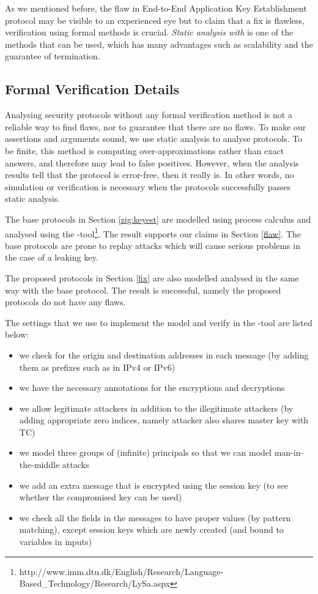 As we mentioned before, the flaw in End-to-End Application Key Establishment protocol may be visible to an experienced eye but to claim that a fix is flawless, verification using formal methods is crucial.
\emph{Static analysis with \LYSA} is one of the methods that can be used, which has many advantages such as scalability and the guarantee of termination.

\subsection{Formal Verification Details}
\label{zig:formal}
Analysing security protocols without any formal verification method is
not a reliable way to find flaws, nor to guarantee that there are no
flaws. To make our assertions and arguments sound, we use static
analysis to analyse protocols. 
To be finite, this method is computing over-approximations rather than
exact answers, and therefore may lead to false positives. However, when the analysis results tell that the protocol is error-free, then it really is. In other words, no simulation or verification is necessary when the protocols successfully passes static analysis.

The base protocols in Section \ref{zig:keyest} are modelled using \LYSA process calculus and analysed using the \LYSA-tool\footnote{http://www.imm.dtu.dk/English/Research/Language-Based\_Technology/Research/LySa.aspx}. The result supports our claims in Section \ref{flaw}. The base protocols are prone to replay attacks which will cause serious problems in the case of a leaking key.

The proposed protocols in Section \ref{fix} are also modelled analysed in the same way with the base protocol. The result is successful, namely the proposed protocols do not have any flaws.

The settings that we use to implement the \LYSA model and verify in the \LYSA-tool are listed below:
\begin{itemize}
\item we check for the origin and destination addresses in each message (by adding them as prefixes such as in IPv4 or IPv6) 
\item we have the necessary annotations for the encryptions and decryptions
\item we allow legitimate attackers in addition to the illegitimate attackers (by adding appropriate zero indices, namely attacker also shares master key with TC)
\item we model three groups of (infinite) principals so that we can model man-in-the-middle attacks
\item we add an extra message that is encrypted using the session key (to see whether the compromised key can be used)
\item we check all the fields in the messages to have proper values (by pattern matching), except session keys which are newly created (and bound to variables in inputs)
\end{itemize}

